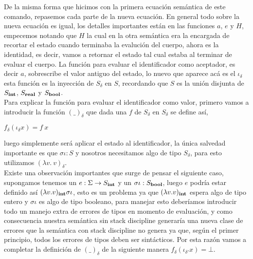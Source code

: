 De la misma forma que hicimos con la primera ecuaci\'on sem\'antica de este
comando, repasemos cada parte de la nueva ecuaci\'on. En general todo sobre 
la nueva ecuaci\'on es igual, los detalles importantes est\'an en las funciones
$a$, $e$ y $H$, empecemos notando que $H$ la cual
en la otra sem\'antica era la encargada de recortar el estado cuando terminaba 
la evaluci\'on del cuerpo, ahora es la identidad, es decir, vamos a retornar el
estado tal cual estaba al terminar de evaluar el cuerpo. La funci\'on para evaluar
el identificador como aceptador, es decir $a$, sobrescribe el valor antiguo del estado,
lo nuevo que aparece ac\'a es el $\iota_\delta$ esta funci\'on es la inyecci\'on
de $S_\delta$ en $S$, recordando que $S$ es la uni\'on disjunta de $S_{\textbf{int}}$, 
$S_{\textbf{real}}$ y $S_{\textbf{bool}}$.\\
Para explicar la funci\'on para evaluar el identificador
como valor, primero vamos a introducir la funci\'on $(\_)_{\delta}$ que dada una $f$
de $S_\delta$ en $S_\delta$ se define as\'i,
\begin{center}
$f_{\delta}(\iota_{\delta}x) = f \ x$
\end{center}
luego simplemente ser\'a aplicar el estado al identificador, la \'unica 
salvedad importante es que $\sigma \iota : S$ y nosotros necesitamos algo de tipo
$S_\delta$, para esto utilizamos $(\lambda v. \ v)_\delta$.\\

Existe una observaci\'on importantes que surge de pensar el siguiente caso,
supongamos tenemos un $e : \Sigma \rightarrow S_{\textbf{int}}$ y un $\sigma \iota : S_{\textbf{bool}}$,
luego $e$ podr\'ia estar definido as\'i $(\lambda v . v)_{\textbf{int}}\sigma \iota$, esto es
un problema ya que $(\lambda v . v)_{\textbf{int}}$ espera algo de tipo entero y 
$\sigma \iota$ es algo de tipo booleano, para manejar esto deber\'iamos 
introducir todo un manejo extra de errores de tipos en momento de evaluaci\'on, 
y como consecuencia nuestra sem\'antica sin stack discipline generar\'ia una
nueva clase de errores que la sem\'antica con stack discipline no genera ya que,
seg\'un el primer principio, todos los errores de tipos deben ser sint\'acticos.
Por esta raz\'on vamos a completar la definici\'on de $(\_)_\delta$ de la
siguiente manera $f_{\delta}(\iota_{\delta'}x) = \bot$. \\

